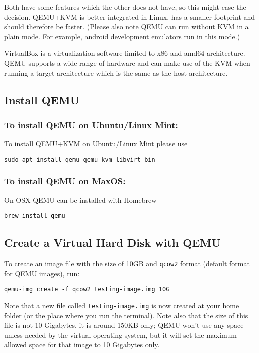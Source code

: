 Both have some features which the other does not have, so this might
ease the decision. QEMU+KVM is better integrated in Linux, has a smaller
footprint and should therefore be faster. (Please also note QEMU can run
without KVM in a plain mode. For example, android development emulators
run in this mode.)

VirtualBox is a virtualization software limited to x86 and amd64
architecture. QEMU supports a wide range of hardware and can make use of
the KVM when running a target architecture which is the same as the host
architecture.

\subsection{Install QEMU}

\subsubsection{To install QEMU on Ubuntu/Linux Mint:}

To install QEMU+KVM on Ubuntu/Linux Mint please use

\begin{lstlisting}
sudo apt install qemu qemu-kvm libvirt-bin
\end{lstlisting}

\subsubsection{To install QEMU on MaxOS:}

On OSX QEMU can be installed with Homebrew

\begin{lstlisting}
brew install qemu
\end{lstlisting}

\subsection{Create a Virtual Hard Disk with QEMU}

To create an image file with the size of 10GB and \texttt{qcow2} format
(default format for QEMU images), run:

\begin{lstlisting}
qemu-img create -f qcow2 testing-image.img 10G
\end{lstlisting}

Note that a new file called \texttt{testing-image.img} is now created at
your home folder (or the place where you run the terminal). Note also
that the size of this file is not 10 Gigabytes, it is around 150KB only;
QEMU won't use any space unless needed by the virtual operating system,
but it will set the maximum allowed space for that image to 10 Gigabytes
only.

